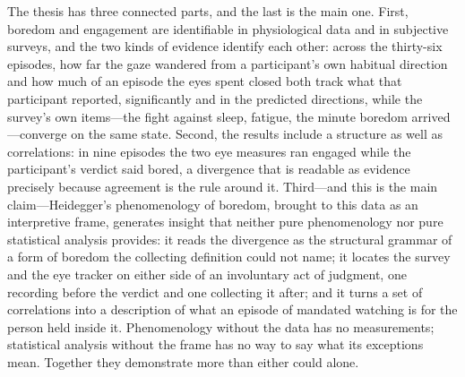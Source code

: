 The thesis has three connected parts, and the last is the main one. First, boredom and
engagement are identifiable in physiological data and in subjective surveys, and the two
kinds of evidence identify each other: across the thirty-six episodes, how far the gaze
wandered from a participant's own habitual direction and how much of an episode the eyes
spent closed both track what that participant reported, significantly and in the predicted
directions, while the survey's own items---the fight against sleep, fatigue, the minute
boredom arrived---converge on the same state. Second, the results include a structure as
well as correlations: in nine episodes the two eye measures ran engaged while the
participant's verdict said bored, a divergence that is readable as evidence precisely
because agreement is the rule around it. Third---and this is the main claim---Heidegger's
phenomenology of boredom, brought to this data as an interpretive frame, generates insight
that neither pure phenomenology nor pure statistical analysis provides: it reads the
divergence as the structural grammar of a form of boredom the collecting definition could
not name; it locates the survey and the eye tracker on either side of an involuntary act of
judgment, one recording before the verdict and one collecting it after; and it turns a set
of correlations into a description of what an episode of mandated watching is for the
person held inside it. Phenomenology without the data has no measurements; statistical
analysis without the frame has no way to say what its exceptions mean. Together they
demonstrate more than either could alone.
